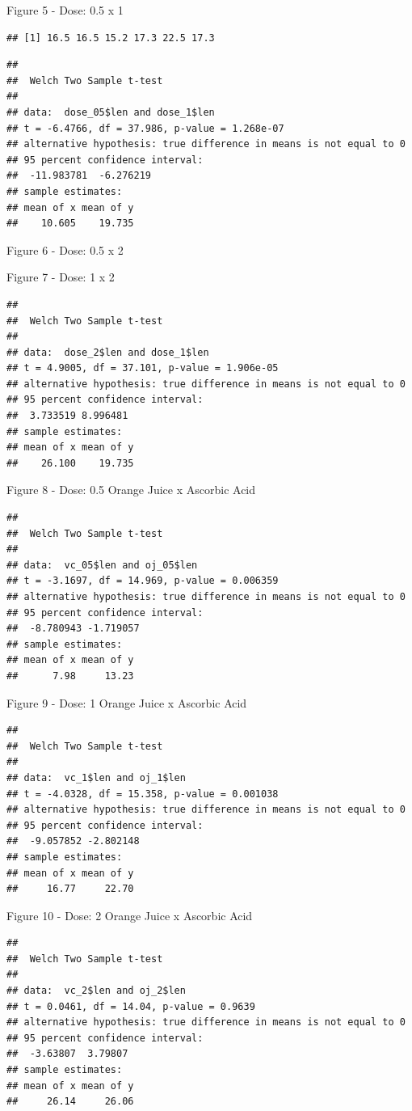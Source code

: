 \documentclass[]{article}
\begin{document}
Figure 5 - Dose: 0.5 x 1

\begin{verbatim}
## [1] 16.5 16.5 15.2 17.3 22.5 17.3
\end{verbatim}

\begin{verbatim}
## 
##  Welch Two Sample t-test
## 
## data:  dose_05$len and dose_1$len
## t = -6.4766, df = 37.986, p-value = 1.268e-07
## alternative hypothesis: true difference in means is not equal to 0
## 95 percent confidence interval:
##  -11.983781  -6.276219
## sample estimates:
## mean of x mean of y 
##    10.605    19.735
\end{verbatim}

Figure 6 - Dose: 0.5 x 2

Figure 7 - Dose: 1 x 2

\begin{verbatim}
## 
##  Welch Two Sample t-test
## 
## data:  dose_2$len and dose_1$len
## t = 4.9005, df = 37.101, p-value = 1.906e-05
## alternative hypothesis: true difference in means is not equal to 0
## 95 percent confidence interval:
##  3.733519 8.996481
## sample estimates:
## mean of x mean of y 
##    26.100    19.735
\end{verbatim}

Figure 8 - Dose: 0.5 Orange Juice x Ascorbic Acid

\begin{verbatim}
## 
##  Welch Two Sample t-test
## 
## data:  vc_05$len and oj_05$len
## t = -3.1697, df = 14.969, p-value = 0.006359
## alternative hypothesis: true difference in means is not equal to 0
## 95 percent confidence interval:
##  -8.780943 -1.719057
## sample estimates:
## mean of x mean of y 
##      7.98     13.23
\end{verbatim}

Figure 9 - Dose: 1 Orange Juice x Ascorbic Acid

\begin{verbatim}
## 
##  Welch Two Sample t-test
## 
## data:  vc_1$len and oj_1$len
## t = -4.0328, df = 15.358, p-value = 0.001038
## alternative hypothesis: true difference in means is not equal to 0
## 95 percent confidence interval:
##  -9.057852 -2.802148
## sample estimates:
## mean of x mean of y 
##     16.77     22.70
\end{verbatim}

Figure 10 - Dose: 2 Orange Juice x Ascorbic Acid

\begin{verbatim}
## 
##  Welch Two Sample t-test
## 
## data:  vc_2$len and oj_2$len
## t = 0.0461, df = 14.04, p-value = 0.9639
## alternative hypothesis: true difference in means is not equal to 0
## 95 percent confidence interval:
##  -3.63807  3.79807
## sample estimates:
## mean of x mean of y 
##     26.14     26.06
\end{verbatim}
\end{document}
